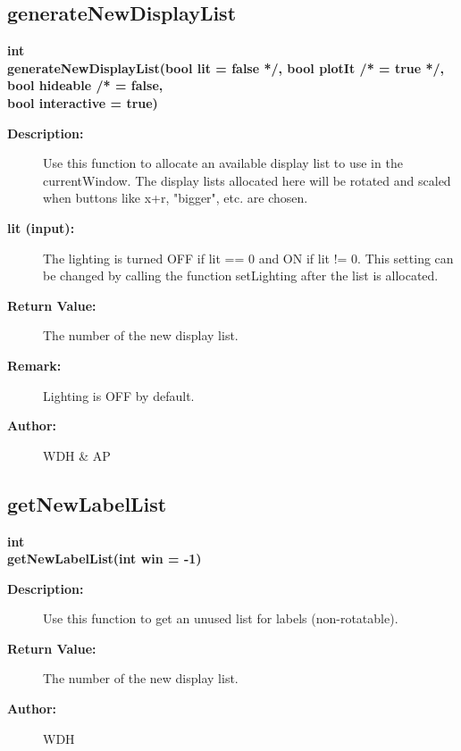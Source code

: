 \subsection{generateNewDisplayList}
 
\begin{flushleft} \textbf{%
int  \\ 
\settowidth{\GLGraphicsInterfaceIncludeArgIndent}{generateNewDisplayList(}%
generateNewDisplayList(bool lit  = false */, bool plotIt /* = true */, bool hideable /* = false,\\ 
\hspace{\GLGraphicsInterfaceIncludeArgIndent}bool interactive  = true) 
}\end{flushleft}
\begin{description}
\item[{\bf Description:}] 
   Use this function to allocate an available display list to use in the currentWindow.
   The display lists allocated here will be rotated and scaled when buttons like x+r, "bigger", etc.
   are chosen.

\item[{\bf lit (input):}] 
    The lighting is turned OFF if lit == 0 and ON if lit != 0. This setting can be changed by calling 
    the function setLighting after the list is allocated.

\item[{\bf Return Value:}]  The number of the new display list.

\item[{\bf Remark:}] 
   Lighting is OFF by default.
\item[{\bf Author:}]  WDH \& AP
\end{description}
\subsection{getNewLabelList}
 
\begin{flushleft} \textbf{%
int  \\ 
\settowidth{\GLGraphicsInterfaceIncludeArgIndent}{getNewLabelList(}%
getNewLabelList(int win  = -1)
}\end{flushleft}
\begin{description}
\item[{\bf Description:}] 
   Use this function to get an unused list for labels (non-rotatable).

\item[{\bf Return Value:}]  The number of the new display list.

\item[{\bf Author:}]  WDH 
\end{description}
